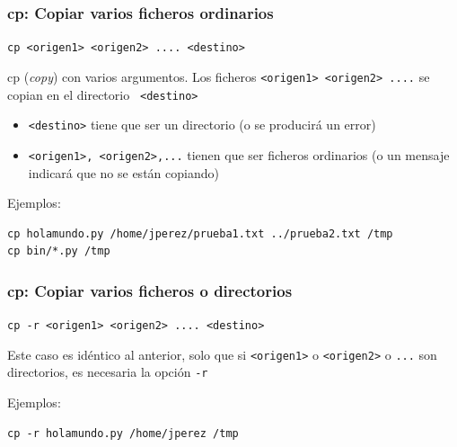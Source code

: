 \documentclass[ucs]{beamer}
\begin{document}
\begin{frame}[fragile]
\frametitle{cp: Copiar varios  ficheros ordinarios }
      \verb|cp <origen1> <origen2> .... <destino>|

cp (\emph{copy}) con varios argumentos.  
Los ficheros 
      \verb|<origen1> <origen2> ....|
se copian en el directorio
      \verb| <destino>|

  \begin{itemize}
    \item 
        \verb|<destino>| tiene que ser un directorio (o se producirá un error)
     \item
        \verb|<origen1>, <origen2>,...| tienen que ser ficheros ordinarios (o un mensaje indicará que no se están copiando) 
     
  \end{itemize}



Ejemplos:

  \begin{footnotesize}
  \begin{verbatim}
cp holamundo.py /home/jperez/prueba1.txt ../prueba2.txt /tmp
cp bin/*.py /tmp
  \end{verbatim}
  \end{footnotesize}

\end{frame}



\begin{frame}[fragile]
\frametitle{cp: Copiar varios  ficheros o directorios }
      \verb|cp -r <origen1> <origen2> .... <destino>|

Este caso es idéntico al anterior, solo que si 
      \verb|<origen1>|
o
      \verb|<origen2>|
o
 \verb|...|
son directorios, es necesaria la opción \verb|-r|



Ejemplos:

  \begin{footnotesize}
  \begin{verbatim}
cp -r holamundo.py /home/jperez /tmp
  \end{verbatim}
  \end{footnotesize}

\end{frame}



\end{document}
